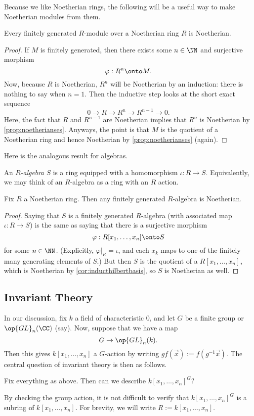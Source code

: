 Because we like Noetherian rings, the following will be a useful way to make Noetherian modules from them.
\begin{proposition} \label{prop:fingennoetherian}
	Every finitely generated $R$-module over a Noetherian ring $R$ is Noetherian.
\end{proposition}
\begin{proof}
	If $M$ is finitely generated, then there exists some $n\in\NN$ and surjective morphism
	\[\varphi:R^n\onto M.\]
	Now, because $R$ is Noetherian, $R^n$ will be Noetherian by an induction: there is nothing to say when $n=1$. Then the inductive step looks at the short exact sequence
	\[0\to R\to R^n\to R^{n-1}\to 0.\]
	Here, the fact that $R$ and $R^{n-1}$ are Noetherian implies that $R^n$ is Noetherian by \autoref{prop:noetherianses}. Anyways, the point is that $M$ is the quotient of a Noetherian ring and hence Noetherian by \autoref{prop:noetherianses} (again).
\end{proof}
Here is the analogous result for algebras.
\begin{definition}[Algebra]
	An \textit{$R$-algebra $S$} is a ring equipped with a homomorphism $\iota:R\to S$. Equivalently, we may think of an $R$-algebra as a ring with an $R$ action.
\end{definition}
\begin{prop} \label{prop:fgalgebraisnoetherian}
	Fix $R$ a Noetherian ring. Then any finitely generated $R$-algebra is Noetherian.
\end{prop}
\begin{proof}
	Saying that $S$ is a finitely generated $R$-algebra (with associated map $\iota:R\to S$) is the same as saying that there is a surjective morphism
	\[\varphi:R[x_1,\ldots,x_n]\onto S\]
	for some $n\in\NN$. (Explicitly, $\varphi|_R=\iota$, and each $x_k$ maps to one of the finitely many generating elements of $S$.) But then $S$ is the quotient of a $R[x_1,\ldots,x_n]$, which is Noetherian by \autoref{cor:inducthilbertbasis}, so $S$ is Noetherian as well.
\end{proof}

\subsection{Invariant Theory}
In our discussion, fix $k$ a field of characteristic $0$, and let $G$ be a finite group or $\op{GL}_n(\CC)$ (say). Now, suppose that we have a map
\[G\to\op{GL}_n(k).\]
Then this gives $k[x_1,\ldots,x_n]$ a $G$-action by writing $gf(\vec x):=f(g^{-1}\vec x).$ The central question of invariant theory is then as follows.
\begin{ques}
	Fix everything as above. Then can we describe $k[x_1,\ldots,x_n]^G$?
\end{ques}
By checking the group action, it is not difficult to verify that $k[x_1,\ldots,x_n]^G$ is a subring of $k[x_1,\ldots,x_n]$. For brevity, we will write $R:=k[x_1,\ldots,x_n]$.

